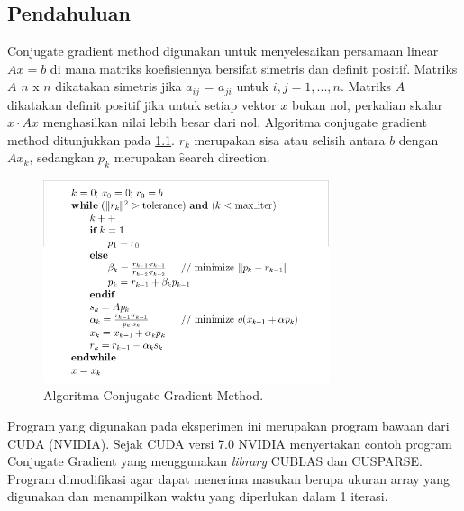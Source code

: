 \chapter{\topikTiga}

\section{Pendahuluan}
	Conjugate gradient method digunakan untuk menyelesaikan persamaan linear $Ax = b$ di mana matriks koefisiennya bersifat simetris dan definit positif.  Matriks $A$ $n$ x $n$ dikatakan simetris jika $a_{ij}$ = $a_{ji}$ untuk $i,j = 1,...,n$.  Matriks $A$ dikatakan definit positif jika untuk setiap vektor $x$ bukan nol, perkalian skalar $x \cdot Ax$ menghasilkan nilai lebih besar dari nol.
	Algoritma conjugate gradient method ditunjukkan pada \pic \ref{fig:cg}.  $r_{k}$ merupakan sisa atau selisih antara $b$ 
	dengan $Ax_{k}$, sedangkan $p_{k}$ merupakan \f{search direction}.
	
	\begin{figure}
		\centering
		\includegraphics[width=0.75\textwidth]
		{pics/cg_par.png}
		\caption{Algoritma Conjugate Gradient Method.}
		\label{fig:cg}
	\end{figure}
	
	Program yang digunakan pada eksperimen ini merupakan program bawaan dari CUDA (NVIDIA).  Sejak CUDA versi 7.0 NVIDIA menyertakan contoh program Conjugate Gradient yang menggunakan \textit{library} CUBLAS dan CUSPARSE.  Program dimodifikasi agar dapat menerima masukan berupa ukuran array yang digunakan dan menampilkan waktu yang diperlukan dalam 1 iterasi.
